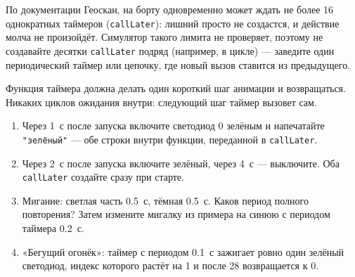 \begin{warnbox}
По документации Геоскан, на борту одновременно может ждать не более 16 однократных таймеров (\verb|callLater|): лишний просто не создастся, и действие молча не произойдёт. Симулятор такого лимита не проверяет, поэтому не создавайте десятки \verb|callLater| подряд (например, в цикле) --- заведите один периодический таймер или цепочку, где новый вызов ставится из предыдущего.
\end{warnbox}

\begin{hintbox}
Функция таймера должна делать один короткий шаг анимации и возвращаться. Никаких циклов ожидания внутри: следующий шаг таймер вызовет сам.
\end{hintbox}

\begin{taskbox}
\begin{enumerate}
  \item Через 1~с после запуска включите светодиод 0 зелёным и напечатайте \verb|"зелёный"| --- обе строки внутри функции, переданной в \verb|callLater|.
  \item Через 2~с после запуска включите зелёный, через 4~с --- выключите. Оба \verb|callLater| создайте сразу при старте.
  \item Мигание: светлая часть 0.5~с, тёмная 0.5~с. Каков период полного повторения? Затем измените мигалку из примера на синюю с периодом таймера 0.2~с.
  \item «Бегущий огонёк»: таймер с периодом 0.1~с зажигает ровно один зелёный светодиод, индекс которого растёт на 1 и после 28 возвращается к 0.
\end{enumerate}
\end{taskbox}
